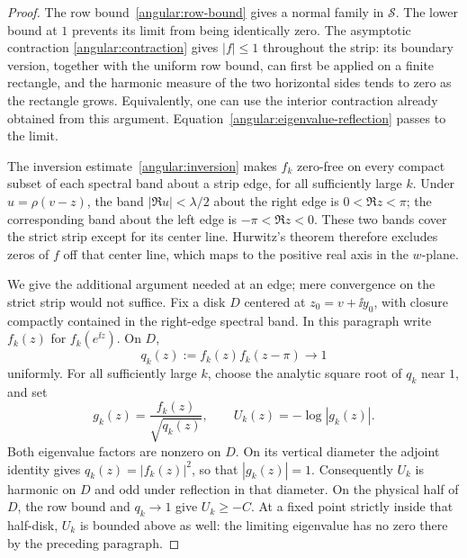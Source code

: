 \begin{proof}
The row bound~\eqref{angular:row-bound} gives a normal family in
$\mathcal S$.  The lower bound at $1$ prevents its limit from being
identically zero.  The asymptotic contraction
\eqref{angular:contraction} gives $|f|\le1$ throughout the strip: its
boundary version, together with the uniform row bound, can first be
applied on a finite rectangle, and the harmonic measure of the two
horizontal sides tends to zero as the rectangle grows.  Equivalently,
one can use the interior contraction already obtained from this
argument.  Equation~\eqref{angular:eigenvalue-reflection} passes to the
limit.

The inversion estimate~\eqref{angular:inversion} makes $f_k$ zero-free
on every compact subset of each spectral band about a strip edge, for
all sufficiently large $k$.  Under $u=\rho(v-z)$, the band
$|\Re u|<\lambda/2$ about the right edge is $0<\Re z<\pi$;
the corresponding band about the left edge is $-\pi<\Re z<0$.
These two bands cover the strict strip except for its center line.
Hurwitz's theorem therefore excludes
zeros of $f$ off that center line, which maps to the positive real
axis in the $w$-plane.

We give the additional argument needed at an edge; mere convergence
on the strict strip would not suffice.  Fix a disk $D$ centered at
$z_0=v+\ii y_0$, with closure compactly contained in the right-edge
spectral band.  In this paragraph write $f_k(z)$ for $f_k(e^{\ii z})$.
On $D$,
\[
 q_k(z):=f_k(z)f_k(z-\pi)\longrightarrow1
\]
uniformly.  For all sufficiently large $k$, choose the analytic square
root of $q_k$ near $1$, and set
\[
 g_k(z)=\frac{f_k(z)}{\sqrt{q_k(z)}},
 \qquad U_k(z)=-\log|g_k(z)|.
\]
Both eigenvalue factors are nonzero on $D$.  On its vertical diameter
the adjoint identity gives $q_k(z)=|f_k(z)|^2$, so that $|g_k(z)|=1$.
Consequently $U_k$ is harmonic on $D$ and odd under reflection in that
diameter.  On the physical half of $D$, the row bound and $q_k\to1$
give $U_k\ge-C$.  At a fixed point strictly inside that half-disk,
$U_k$ is bounded above as well: the limiting eigenvalue has no zero
there by the preceding paragraph.


\end{proof}
